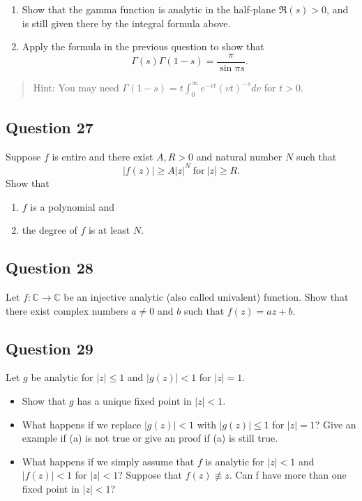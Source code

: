 \documentclass[12pt]{article}
\begin{document}
\begin{enumerate}
\def\labelenumi{\arabic{enumi}.}
\item
  Show that the gamma function is analytic in the half-plane
  \(\Re (s)>0\), and is still given there by the integral formula above.
\item
  Apply the formula in the previous question to show that
  \[\Gamma(s)\Gamma(1-s)=\frac{\pi}{\sin \pi s}.\]
\end{enumerate}

\begin{quote}
Hint: You may need
\(\displaystyle{\Gamma(1-s)=t \int_0^{\infty}e^{-vt}(vt)^{-s} dv}\) for
\(t>0\).
\end{quote}

\hypertarget{question-27-2}{%
\subsection{Question 27}\label{question-27-2}}

Suppose \(f\) is entire and there exist \(A, R >0\) and natural number
\(N\) such that \[|f(z)| \geq A |z|^N\ \text{for}\ |z| \geq R.\] Show
that

\begin{enumerate}
\def\labelenumi{(\roman{enumi})}
\item
  \(f\) is a polynomial and
\item
  the degree of \(f\) is at least \(N\).
\end{enumerate}

\hypertarget{question-28-2}{%
\subsection{Question 28}\label{question-28-2}}

Let \(f: {\mathbb C} \rightarrow {\mathbb C}\) be an injective analytic
(also called univalent) function. Show that there exist complex numbers
\(a \neq 0\) and \(b\) such that \(f(z) = az + b\).

\hypertarget{question-29-2}{%
\subsection{Question 29}\label{question-29-2}}

Let \(g\) be analytic for \(|z|\leq 1\) and \(|g(z)| < 1\) for
\(|z| = 1\).

\begin{itemize}
\item
  Show that \(g\) has a unique fixed point in \(|z| < 1\).
\item
  What happens if we replace \(|g(z)| < 1\) with \(|g(z)|\leq 1\) for
  \(|z|=1\)? Give an example if (a) is not true or give an proof if (a)
  is still true.
\item
  What happens if we simply assume that \(f\) is analytic for
  \(|z| < 1\) and \(|f(z)| < 1\) for \(|z| < 1\)? Suppose that
  \(f(z) \not\equiv z\). Can f have more than one fixed point in
  \(|z| < 1\)?
\end{itemize}
\end{document}

